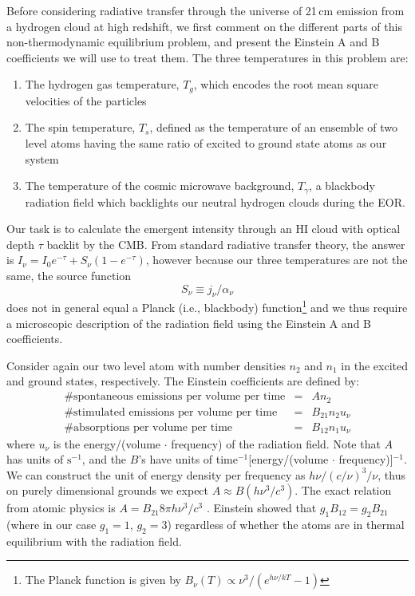 {Before considering radiative transfer through the universe of 21\,cm emission from a hydrogen cloud at high redshift, we first comment on the different parts of this non-thermodynamic equilibrium problem, and present the Einstein A and B coefficients we will use to treat them. The three temperatures in this problem are:
\begin{enumerate}
\item The hydrogen gas temperature, $T_g$, which encodes the root mean square velocities of the particles
\item The spin temperature, $T_s$, defined as the temperature of an ensemble of two level atoms having the same ratio of excited to ground state atoms as our system
\item The temperature of the cosmic microwave background, $T_\gamma$, a blackbody radiation field which backlights our neutral hydrogen clouds during the EOR. 
\end{enumerate}

Our task is to calculate the emergent intensity through an HI cloud with optical depth $\tau$ backlit by the CMB. From standard radiative transfer theory, the answer is $I_\nu=I_0e^{-\tau}+S_\nu(1-e^{-\tau})$, however because our three temperatures are not the same, the source function 
\begin{equation}
S_\nu\equiv j_\nu/\alpha_\nu	
\end{equation}
does not in general equal a Planck (i.e., blackbody) function\footnote{The Planck function is given by $B_\nu(T)\propto\nu^3/(e^{h\nu/kT}-1)$} and we thus require a microscopic description of the radiation field using the Einstein A and B coefficients.

Consider again our two level atom with number densities $n_2$ and $n_1$ in the excited and ground states, respectively. The Einstein coefficients are defined by:
\begin{eqnarray}
\text{\# spontaneous emissions per volume per time}&=&An_2 \nonumber\\
\text{\# stimulated emissions per volume per time}&=&B_{21}n_2u_\nu \nonumber\\
\text{\# absorptions per volume per time}&=&B_{12}n_1u_\nu 
\end{eqnarray}
where $u_\nu$ is the energy/(volume $\cdot$ frequency) of the radiation field. Note that $A$ has units of $\text{s}^{-1}$, and the $B$'s have units of time$^{-1}$[energy/(volume $\cdot$ frequency)]$^{-1}$. We can construct the unit of energy density per frequency as $h\nu/(c/\nu)^3/\nu$, thus on purely dimensional grounds we expect $A\approx B (h\nu^3/c^3)$. The exact relation from atomic physics is $A=B_{21}8\pi h \nu^3/c^3$ \citep{choudhuri2010astrophysics} . Einstein showed that $g_1B_{12}=g_2B_{21}$ (where in our case $g_1=1$, $g_2=3$) regardless of whether the atoms are in thermal equilibrium with the radiation field.

}
